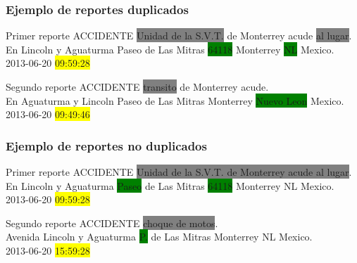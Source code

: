 \documentclass{beamer}
\begin{document}
\begin{frame}
  \frametitle{Ejemplo de reportes duplicados}

  \begin{block}{Primer reporte}
    ACCIDENTE \colorbox{gray}{Unidad de la S.V.T.} de Monterrey acude \colorbox{gray}{al lugar}.\\
    En Lincoln y Aguaturma Paseo de Las Mitras \colorbox{green}{64118} Monterrey \colorbox{green}{NL} Mexico.\\
    2013-06-20 \colorbox{yellow}{09:59:28}
  \end{block}
  \vspace{5 mm}
  \begin{block}{Segundo reporte}
    ACCIDENTE \colorbox{gray}{transito} de Monterrey acude.\\
    En Aguaturma y Lincoln Paseo de Las Mitras Monterrey \colorbox{green}{Nuevo Leon} Mexico.\\
    2013-06-20 \colorbox{yellow}{09:49:46}
  \end{block}

\end{frame}

\begin{frame}
  \frametitle{Ejemplo de reportes no duplicados}
  
  \begin{block}{Primer reporte}
    ACCIDENTE \colorbox{gray}{Unidad de la S.V.T. de Monterrey acude al lugar}.\\
    En Lincoln y Aguaturma \colorbox{green}{Paseo} de Las Mitras \colorbox{green}{64118} Monterrey NL Mexico.\\
    2013-06-20 \colorbox{yellow}{09:59:28}
  \end{block}
  \vspace{5 mm}
  \begin{block}{Segundo reporte}
    ACCIDENTE \colorbox{gray}{choque de motos}.\\
    Avenida Lincoln y Aguaturma \colorbox{green}{P.} de Las Mitras Monterrey NL Mexico.\\
    2013-06-20 \colorbox{yellow}{15:59:28}
  \end{block}
\end{frame}
\end{document}
